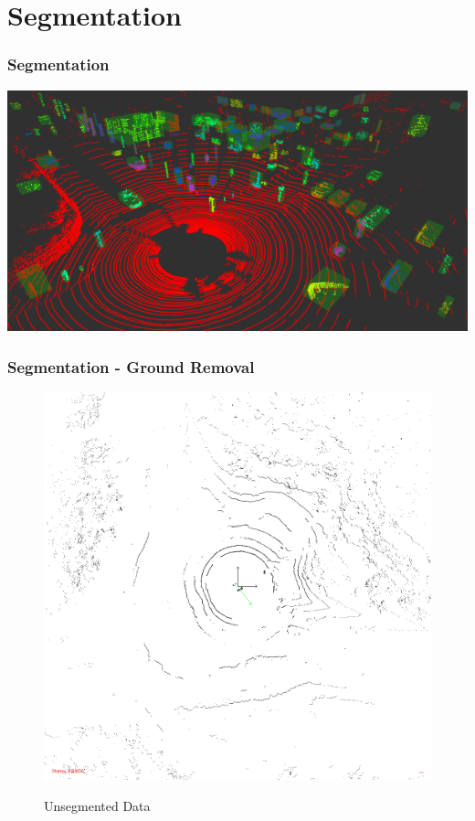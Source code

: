 \documentclass[nosymbols]{beamer}	%
\begin{document}
\section{Segmentation}

\begin{frame}
\frametitle{Segmentation}
 \includegraphics[width=\textwidth,height=0.7\textheight,keepaspectratio]{bilder/segmented_objects.png} 
\end{frame}



\begin{frame}
\frametitle{Segmentation - Ground Removal}
\begin{figure}[!ht]
\caption{Unsegmented Data}
\includegraphics[width=\textwidth,height=0.7\textheight,keepaspectratio]{bilder/before_seg/img100084.png}
\label{segments}
\end{figure}
\end{frame}
\end{document}
